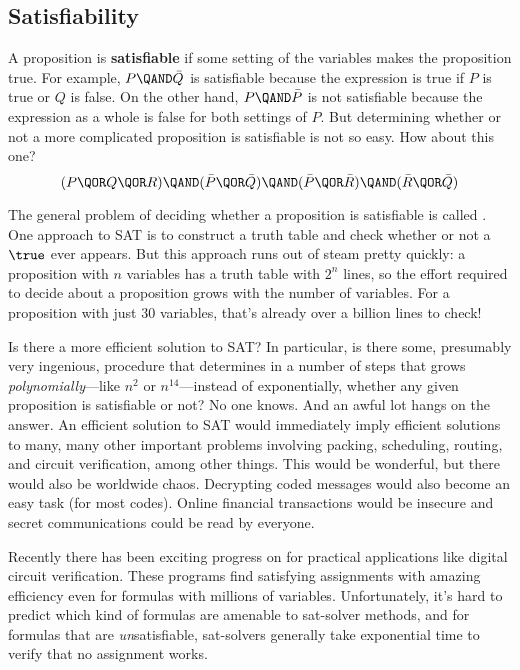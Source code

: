 \begin{editingnoes}
\section{Satisfiability}\label{SAT_sec}

A proposition is \textbf{satisfiable} if some setting of the variables
makes the proposition true.  For example, $P \QAND \bar{Q}$ is
satisfiable because the expression is true if $P$ is true or $Q$ is
false.  On the other hand, $P \QAND \bar{P}$ is not satisfiable because
the expression as a whole is false for both settings of $P$.  But
determining whether or not a more complicated proposition is satisfiable
is not so easy.  How about this one?
%
\[
(P \QOR Q \QOR R) \QAND (\bar P \QOR \bar Q)
                  \QAND (\bar P \QOR \bar R)
                  \QAND (\bar R \QOR \bar Q)
\]

The general problem of deciding whether a proposition is satisfiable
is called .  One approach to SAT is to construct a truth
table and check whether or not a $\true$ ever appears.  But this
approach runs out of steam pretty quickly: a proposition with $n$
variables has a truth table with $2^n$ lines, so the effort required
to decide about a proposition grows  with the
number of variables.  For a proposition with just 30 variables, that's
already over a billion lines to check!

Is there a more  efficient solution
to SAT?  In particular, is there some, presumably very ingenious,
procedure that determines in a number of steps that grows
\emph{polynomially}---like $n^2$ or $n^{14}$---instead of
exponentially, whether any given proposition is satisfiable or not?
No one knows.  And an awful lot hangs on the answer.  An efficient
solution to SAT would immediately imply efficient solutions to many,
many other important problems involving packing, scheduling, routing,
and circuit verification, among other things.  This would be
wonderful, but there would also be worldwide chaos.  Decrypting coded
messages would also become an easy task (for most codes).  Online
financial transactions would be insecure and secret communications
could be read by everyone.

Recently there has been exciting progress on  for
practical applications like digital circuit verification.  These
programs find satisfying assignments with amazing efficiency even for
formulas with millions of variables.  Unfortunately, it's hard to
predict which kind of formulas are amenable to sat-solver methods, and
for formulas that are \emph{un}satisfiable, sat-solvers generally take
exponential time to verify that no assignment works.


\end{editingnoes}
